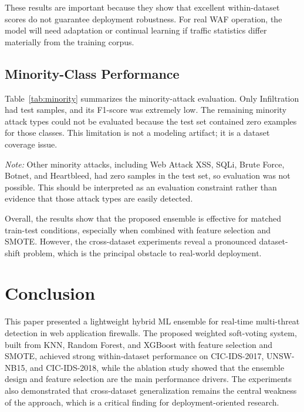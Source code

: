 \documentclass[conference]{IEEEtran}
\begin{document}
These results are important because they show that excellent within-dataset scores do not guarantee deployment robustness. For real WAF operation, the model will need adaptation or continual learning if traffic statistics differ materially from the training corpus.

\subsection{Minority-Class Performance}
Table~\ref{tab:minority} summarizes the minority-attack evaluation. Only Infiltration had test samples, and its F1-score was extremely low. The remaining minority attack types could not be evaluated because the test set contained zero examples for those classes. This limitation is not a modeling artifact; it is a dataset coverage issue.

\begin{table}[htbp]
\caption{Per-Class Minority Attack Performance.}
\label{tab:minority}
\centering
{}
\end{table}

\noindent\textit{Note:} Other minority attacks, including Web Attack XSS, SQLi, Brute Force, Botnet, and Heartbleed, had zero samples in the test set, so evaluation was not possible. This should be interpreted as an evaluation constraint rather than evidence that those attack types are easily detected.

Overall, the results show that the proposed ensemble is effective for matched train-test conditions, especially when combined with feature selection and SMOTE. However, the cross-dataset experiments reveal a pronounced dataset-shift problem, which is the principal obstacle to real-world deployment.

\section{Conclusion}
This paper presented a lightweight hybrid ML ensemble for real-time multi-threat detection in web application firewalls. The proposed weighted soft-voting system, built from KNN, Random Forest, and XGBoost with feature selection and SMOTE, achieved strong within-dataset performance on CIC-IDS-2017, UNSW-NB15, and CIC-IDS-2018, while the ablation study showed that the ensemble design and feature selection are the main performance drivers. The experiments also demonstrated that cross-dataset generalization remains the central weakness of the approach, which is a critical finding for deployment-oriented research.
\end{document}
